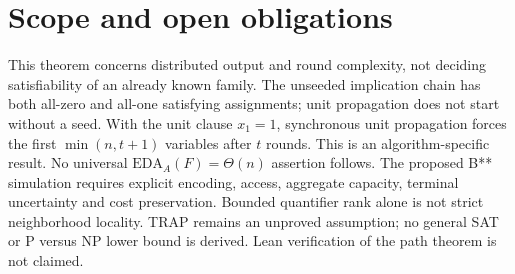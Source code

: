 \documentclass[11pt]{article}
\begin{document}
\section{Scope and open obligations}
This theorem concerns distributed output and round complexity,
not deciding satisfiability of an already known family.
The unseeded implication chain has both all-zero and all-one
satisfying assignments; unit propagation does not start without a seed.
With the unit clause $x_1=1$, synchronous unit propagation forces
the first $\min(n,t+1)$ variables after $t$ rounds.
This is an algorithm-specific result.
No universal $\mathrm{EDA}_A(F)=\Theta(n)$ assertion follows.
The proposed B** simulation requires explicit encoding, access,
aggregate capacity, terminal uncertainty and cost preservation.
Bounded quantifier rank alone is not strict neighborhood locality.
TRAP remains an unproved assumption; no general SAT or P versus NP
lower bound is derived. Lean verification of the path theorem is
not claimed.
\end{document}
